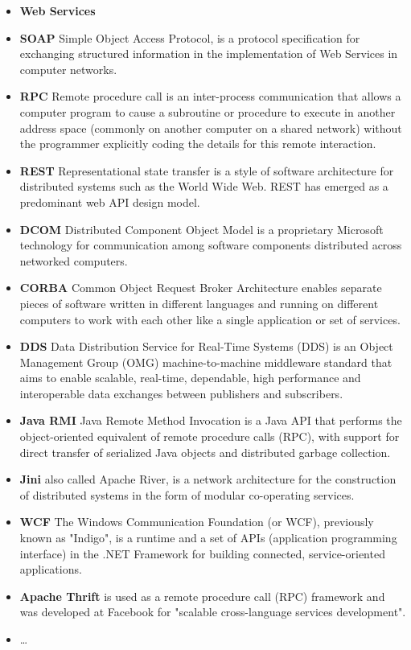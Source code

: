 \begin{itemize}
  \item \label{itm:soa_technologies} \textbf{Web Services}
  \item{\textbf{SOAP}} Simple Object Access Protocol, is a protocol specification for exchanging structured information in the implementation of Web Services in computer networks.
  \item{\textbf{RPC}} Remote procedure call is an inter-process communication that allows
  a computer program to cause a subroutine or procedure to execute in another address space (commonly on another computer on a shared network) without the programmer explicitly coding the details for this remote interaction. 
  \item{\textbf{REST}} Representational state transfer is a style of software architecture for distributed systems such as the World Wide Web. \gls{REST} has emerged as a predominant web API design model.
  \item{\textbf{DCOM}} Distributed Component Object Model is a proprietary Microsoft technology for communication among software components distributed across networked computers. 
  \item{\textbf{CORBA}}  Common Object Request Broker Architecture enables separate pieces of software written in different
    languages and running on different computers to work with each other like a single application or set of services.
  \item{\textbf{DDS}} Data Distribution Service for Real-Time Systems (DDS) is an Object
  Management Group (OMG) machine-to-machine middleware standard that aims to
  enable scalable, real-time, dependable, high performance and interoperable data exchanges between publishers and subscribers. 
  \item{\textbf{Java RMI}} Java Remote Method Invocation is a Java API that performs the
  object-oriented equivalent of remote procedure calls (RPC), with support for direct transfer of serialized Java objects and distributed garbage collection.
  \item{\textbf{Jini}}  also called Apache River, is a network architecture for the construction of distributed systems in the form of modular co-operating services.
  \item{\textbf{WCF}} The Windows Communication Foundation (or WCF), previously known as
  "Indigo", is a runtime and a set of APIs (application programming interface)
  in the .NET Framework for building connected, service-oriented applications.
  \item{\textbf{Apache Thrift}} is used as a remote procedure call (RPC) framework and
  was developed at Facebook for "scalable cross-language services development".
  \item \ldots
\end{itemize}

